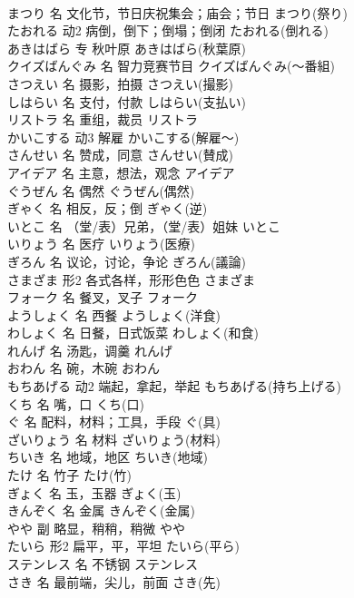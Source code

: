\documentclass[8pt]{extreport}
\begin{document}
\begin{CJK}{UTF8}{min}
\\	まつり	名	文化节，节日庆祝集会；庙会；节日	まつり(祭り)	
\\	たおれる	动2	病倒，倒下；倒塌；倒闭	たおれる(倒れる)	
\\	あきはばら	专	秋叶原	あきはばら(秋葉原)	
\\	クイズばんぐみ	名	智力竞赛节目	クイズばんぐみ(～番組)	
\\	さつえい	名	摄影，拍摄	さつえい(撮影)	
\\	しはらい	名	支付，付款	しはらい(支払い)	
\\	リストラ	名	重组，裁员	リストラ	
\\	かいこする	动3	解雇	かいこする(解雇～)	
\\	さんせい	名	赞成，同意	さんせい(賛成)	
\\	アイデア	名	主意，想法，观念	アイデア	
\\	ぐうぜん	名	偶然	ぐうぜん(偶然)	
\\	ぎゃく	名	相反，反；倒	ぎゃく(逆)	
\\	いとこ	名	（堂/表）兄弟，（堂/表）姐妹	いとこ	
\\	いりょう	名	医疗	いりょう(医療)	
\\	ぎろん	名	议论，讨论，争论	ぎろん(議論)	
\\	さまざま	形2	各式各样，形形色色	さまざま	
\\	フォーク	名	餐叉，叉子	フォーク	
\\	ようしょく	名	西餐	ようしょく(洋食)	
\\	わしょく	名	日餐，日式饭菜	わしょく(和食)	
\\	れんげ	名	汤匙，调羹	れんげ	
\\	おわん	名	碗，木碗	おわん	
\\	もちあげる	动2	端起，拿起，举起	もちあげる(持ち上げる)	
\\	くち	名	嘴，口	くち(口)	
\\	ぐ	名	配料，材料；工具，手段	ぐ(具)	
\\	ざいりょう	名	材料	ざいりょう(材料)	
\\	ちいき	名	地域，地区	ちいき(地域)	
\\	たけ	名	竹子	たけ(竹)	
\\	ぎょく	名	玉，玉器	ぎょく(玉)	
\\	きんぞく	名	金属	きんぞく(金属)	
\\	やや	副	略显，稍稍，稍微	やや	
\\	たいら	形2	扁平，平，平坦	たいら(平ら)	
\\	ステンレス	名	不锈钢	ステンレス	
\\	さき	名	最前端，尖儿，前面	さき(先)	

\end{CJK}
\end{document}
